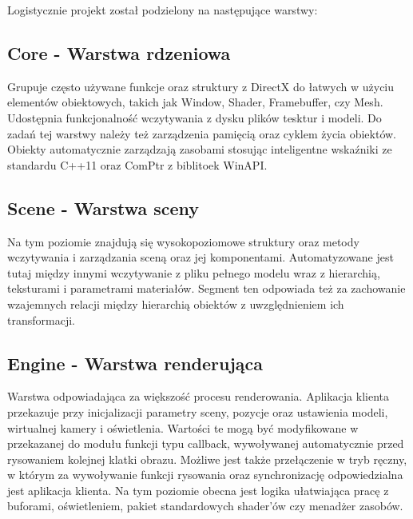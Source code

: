 Logistycznie projekt został podzielony na następujące warstwy:

\subsection{\textbf{Core} - Warstwa rdzeniowa}
Grupuje często używane funkcje oraz struktury z DirectX do łatwych w użyciu elementów obiektowych, takich jak Window, Shader, Framebuffer, czy Mesh.
Udostępnia funkcjonalność wczytywania z dysku plików tesktur i modeli.
Do zadań tej warstwy należy też zarządzenia pamięcią oraz cyklem życia obiektów.
Obiekty automatycznie zarządzają zasobami stosując inteligentne wskaźniki ze standardu C++11 oraz ComPtr z biblitoek WinAPI.

\subsection{\textbf{Scene} - Warstwa sceny}
Na tym poziomie znajdują się wysokopoziomowe struktury oraz metody wczytywania i zarządzania sceną oraz jej komponentami.
Automatyzowane jest tutaj między innymi wczytywanie z pliku pełnego modelu wraz z hierarchią, teksturami i parametrami materiałów.
Segment ten odpowiada też za zachowanie wzajemnych relacji między hierarchią obiektów z uwzględnieniem ich transformacji.

\subsection{\textbf{Engine} - Warstwa renderująca}
Warstwa odpowiadająca za większość procesu renderowania.
Aplikacja klienta przekazuje przy inicjalizacji parametry sceny, pozycje oraz ustawienia modeli, wirtualnej kamery i oświetlenia.
Wartości te mogą być modyfikowane w przekazanej do modułu funkcji typu callback, wywoływanej automatycznie przed rysowaniem kolejnej klatki obrazu.
Możliwe jest także przełączenie w tryb ręczny, w którym za wywoływanie funkcji rysowania oraz synchronizację odpowiedzialna jest aplikacja klienta.
Na tym poziomie obecna jest logika ułatwiająca pracę z buforami, oświetleniem, pakiet standardowych shader'ów czy menadżer zasobów.